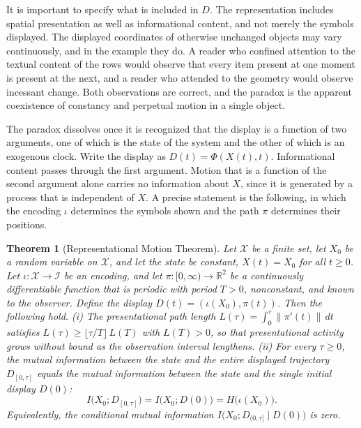 \documentclass[11pt]{report}
\newtheorem{theorem}{Theorem}[chapter]
\theoremstyle{definition}
\theoremstyle{remark}
\newcommand{\RR}{\mathbb{R}}
\newcommand{\cX}{\mathcal{X}}
\begin{document}
It is important to specify what is included in $D$. The representation includes spatial presentation as well as informational content, and not merely the symbols displayed. The displayed coordinates of otherwise unchanged objects may vary continuously, and in the example they do. A reader who confined attention to the textual content of the rows would observe that every item present at one moment is present at the next, and a reader who attended to the geometry would observe incessant change. Both observations are correct, and the paradox is the apparent coexistence of constancy and perpetual motion in a single object.

The paradox dissolves once it is recognized that the display is a function of two arguments, one of which is the state of the system and the other of which is an exogenous clock. Write the display as $D(t)=\Phi(X(t),t)$. Informational content passes through the first argument. Motion that is a function of the second argument alone carries no information about $X$, since it is generated by a process that is independent of $X$. A precise statement is the following, in which the encoding $\iota$ determines the symbols shown and the path $\pi$ determines their positions.

\begin{theorem}[Representational Motion Theorem]\label{thm:motion}
Let $\cX$ be a finite set, let $X_0$ be a random variable on $\cX$, and let the state be constant, $X(t)=X_0$ for all $t\ge0$. Let $\iota:\cX\to\mathcal{I}$ be an encoding, and let $\pi:[0,\infty)\to\RR^2$ be a continuously differentiable function that is periodic with period $T>0$, nonconstant, and known to the observer. Define the display $D(t)=(\iota(X_0),\pi(t))$. Then the following hold.
(i) The presentational path length $L(\tau)=\int_0^\tau\|\pi'(t)\|\,dt$ satisfies $L(\tau)\ge\lfloor\tau/T\rfloor\,L(T)$ with $L(T)>0$, so that presentational activity grows without bound as the observation interval lengthens.
(ii) For every $\tau\ge0$, the mutual information between the state and the entire displayed trajectory $D_{[0,\tau]}$ equals the mutual information between the state and the single initial display $D(0)$:
\[
I\bigl(X_0;D_{[0,\tau]}\bigr)=I\bigl(X_0;D(0)\bigr)=H\bigl(\iota(X_0)\bigr).
\]
Equivalently, the conditional mutual information $I\bigl(X_0;D_{(0,\tau]}\mid D(0)\bigr)$ is zero.
\end{theorem}
\end{document}
